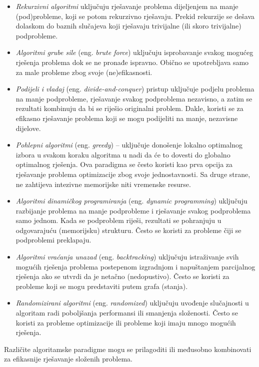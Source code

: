 \begin{itemize}
	\item \textit{Rekurzivni algoritmi}  uključuju rješavanje problema dijeljenjem na manje (pod)probleme, koji se potom rekurzivno rješavaju. Prekid rekurzije se dešava dolaskom do baznih slučajeva koji rješavaju trivijalne (ili skoro trivijalne) podprobleme. 
	\item \textit{Algoritmi grube sile} (eng.\textit{ brute force}) uključuju isprobavanje svakog mogućeg rješenja problema dok se ne pronađe ispravno. Obično se upotrebljava samo za male probleme zbog svoje (ne)efi\-kasnosti.
    \item \textit{ Podijeli i vladaj} (eng. \textit{divide-and-conquer}) pristup uključuje podjelu problema na manje podprobleme, rješavanje svakog pod\-problema neza\-visno, a zatim se rezultati  kombinuju da bi se riješio originalni problem. Dakle,  koristi se za efikasno rješavanje problema koji se mogu podijeliti na manje, nezavisne dijelove.
    \item \textit{Pohlepni algoritmi} (eng. \textit{greedy}) --  uključuje donošenje lokalno optima\-lnog izbora u svakom koraku algoritma u nadi da će to dovesti do globalno optimalnog rješenja. Ova paradigma se često koristi kao prva opcija za rješavanje problema optimizacije  zbog svoje jednostavnosti. Sa druge strane,  ne zahtijeva intezivne memorijske niti vremenske resurse. 
    \item \textit{Algoritmi dinamičkog programiranja} (eng. \textit{dynamic programming})  uklju\-čuju razbijanje problema na manje podpro\-bleme i rješavanje svakog podproblema samo jednom. Kada se podproblem riješi, rezultati se pohranjuju u odgovarajuću (memorijsku) strukturu.    Često se koristi za probleme čiji se podproblemi preklapaju.
    \item \textit{Algoritmi vraćanja unazad} (eng. \textit{backtracking}) uključuju  istraži\-vanje svih mogućih rješenja problema postepenom izgradnjom i napu\-štanjem parcijalnog rješenja ako se utvrdi da je netačno (nedopu\-stivo). Često se koristi za probleme koji se mogu predsta\-viti putem grafa (stanja).
    \item \textit{Randomizirani algoritmi} (eng. \textit{randomized})  uključuju uvođenje sluča\-jnosti u algoritam radi poboljšanja performansi ili smanjenja složenosti. Često se koristi za probleme optimizacije ili probleme koji imaju mnogo mogućih rješenja.
\end{itemize}

Različite algoritamske paradigme mogu se   prilagoditi ili međusobno kombinovati za efikasnije rješavanje složenih problema. 

